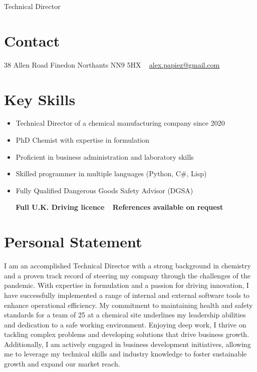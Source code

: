 \documentclass[]{friggeri-cv}
\begin{document}
       {Technical Director}
       {}


\begin{aside}
  \section{Contact}
    38 Allen Road
    Finedon
    Northants
    NN9 5HX
    ~
    \href{mailto:alex.papiez@gmail.com}{\mbox{alex.papiez@gmail.com}}
    
 \section{Key Skills}
   \begin{itemize}
   \item Technical Director of a chemical manufacturing company since 2020
   \item PhD Chemist with expertise in formulation
   \item Proficient in business administration and laboratory skills
   \item Skilled programmer in multiple languages (Python, C#, Lisp)
   \item Fully Qualified Dangerous Goods Safety Advisor (DGSA)
   \end{itemize}
   ~
   ~
   \textbf{Full U.K. Driving licence}
   ~
   \textbf{References available on request}
\end{aside}

\section{Personal Statement}

I am an accomplished Technical Director with a strong background in chemistry and a proven track record of steering my company through the challenges of the pandemic. With expertise in formulation and a passion for driving innovation, I have successfully implemented a range of internal and external software tools to enhance operational efficiency. My commitment to maintaining health and safety standards for a team of 25 at a chemical site underlines my leadership abilities and dedication to a safe working environment. Enjoying deep work, I thrive on tackling complex problems and developing solutions that drive business growth. Additionally, I am actively engaged in business development initiatives, allowing me to leverage my technical skills and industry knowledge to foster sustainable growth and expand our market reach.
\end{document}
